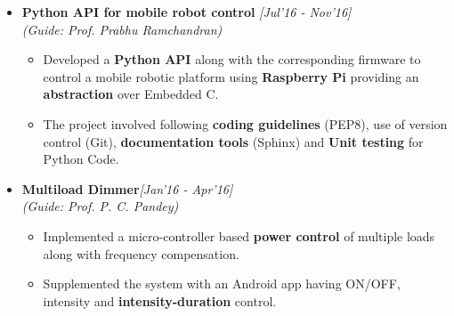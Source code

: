 \documentclass{article}
\begin{document}
\begin{itemize}[leftmargin=3.5mm]
	\setlength{\itemsep}{-0.29em}
	\item \textbf{Python API for mobile robot control  }\hfill{\textit{[Jul'16 - Nov'16]}}
	\\\textit{(Guide: Prof. Prabhu Ramchandran)}
	\vspace{-6pt}
	\begin{itemize}[leftmargin=3.5mm]
		\vspace{-0.5mm}
		\setlength{\itemsep}{1mm}
		\item Developed a \textbf{Python API} along with the corresponding firmware to control a mobile robotic platform using \textbf{Raspberry Pi} providing an \textbf{abstraction} over Embedded C.
		\vspace{-1.5mm}
		\item The project involved following \textbf{coding guidelines} (PEP8), use of version control (Git), \textbf{documentation tools} (Sphinx) and \textbf{Unit testing }for Python Code.
	\end{itemize}
\end{itemize}
\vspace{-5mm}
\begin{itemize}[leftmargin=3.5mm]
	\setlength{\itemsep}{-0.29em}
	\item \textbf{Multiload Dimmer}\hspace{2mm}\hfill{\textit{[Jan'16 - Apr'16]}}
	\\\textit{(Guide: Prof. P. C. Pandey)}
	\vspace{-8pt}
	\begin{itemize}[leftmargin=3.5mm]
		\vspace{-0.5mm}
		\setlength{\itemsep}{1mm}
		\item Implemented a micro-controller based \textbf{power control} of multiple loads along with frequency compensation.  
		\vspace{-1.5mm}
		\item Supplemented the system with an Android app having ON/OFF, intensity and \textbf{intensity-duration} control.
	\end{itemize}
\end{itemize}
\vspace{-5mm}
\end{document}
